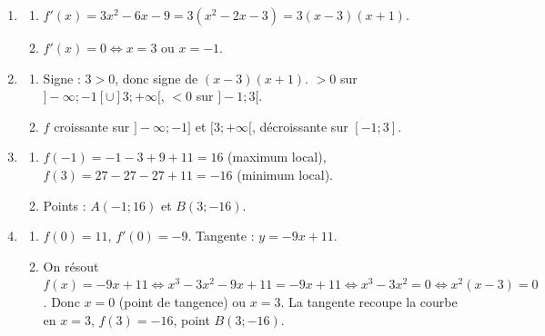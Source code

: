 \begin{enumerate}[label=\arabic*)]
\item 
\begin{enumerate}[label=\alph*)]
\item $f'(x)=3x^2-6x-9=3(x^2-2x-3)=3(x-3)(x+1)$.
\item $f'(x)=0 \iff x=3$ ou $x=-1$.
\end{enumerate}
\item 
\begin{enumerate}[label=\alph*)]
\item Signe : $3>0$, donc signe de $(x-3)(x+1)$. $>0$ sur $]-\infty;-1[\cup]3;+\infty[$, $<0$ sur $]-1;3[$.
\item $f$ croissante sur $]-\infty;-1]$ et $[3;+\infty[$, décroissante sur $[-1;3]$.
\end{enumerate}
\item 
\begin{enumerate}[label=\alph*)]
\item $f(-1)=-1-3+9+11=16$ (maximum local), $f(3)=27-27-27+11=-16$ (minimum local).
\item Points : $A(-1;16)$ et $B(3;-16)$.
\end{enumerate}
\item 
\begin{enumerate}[label=\alph*)]
\item $f(0)=11$, $f'(0)=-9$. Tangente : $y=-9x+11$.
\item On résout $f(x)=-9x+11 \iff x^3-3x^2-9x+11=-9x+11 \iff x^3-3x^2=0 \iff x^2(x-3)=0$. Donc $x=0$ (point de tangence) ou $x=3$. La tangente recoupe la courbe en $x=3$, $f(3)=-16$, point $B(3;-16)$.
\end{enumerate}
\end{enumerate}